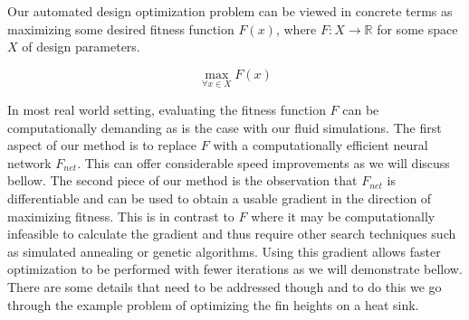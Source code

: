 \documentclass{article} %
\begin{document}
Our automated design optimization problem can be viewed in concrete terms as maximizing some desired fitness function $F(x)$, where $F:X \rightarrow \mathbb{R}$ for some space $X$ of design parameters.

\begin{equation}
  \max_{\forall x \in X} F(x)
\end{equation}

In most real world setting, evaluating the fitness function $F$ can be computationally demanding as is the case with our fluid simulations. The first aspect of our method is to replace $F$ with a computationally efficient neural network $F_{net}$. This can offer considerable speed improvements as we will discuss bellow. The second piece of our method is the observation that $F_{net}$ is differentiable and can be used to obtain a usable gradient in the direction of maximizing fitness. This is in contrast to $F$ where it may be computationally infeasible to calculate the gradient and thus require other search techniques such as simulated annealing or genetic algorithms. Using this gradient allows faster optimization to be performed with fewer iterations as we will demonstrate bellow. There are some details that need to be addressed though and to do this we go through the example problem of optimizing the fin heights on a heat sink.
\end{document}
